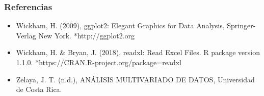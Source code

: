\documentclass[12pt]{beamer}
\begin{document}
\begin{frame}
\frametitle{Referencias}
\begin{itemize}
\item Wickham, H. (2009), ggplot2: Elegant Graphics for Data Analysis, Springer-Verlag New York.
*http://ggplot2.org


\item Wickham, H. \& Bryan, J. (2018), readxl: Read Excel Files. R package version 1.1.0.
*https://CRAN.R-project.org/package=readxl


\item Zelaya, J. T. (n.d.), ANÁLISIS MULTIVARIADO DE DATOS, Universidad de Costa Rica.
\end{itemize}
\end{frame}
\end{document}
